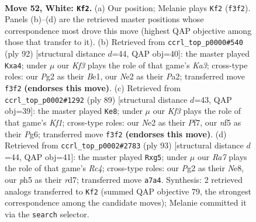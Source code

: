 \documentclass[11pt]{article}
\begin{document}
\clearpage

\begin{figure}[p]\centering
\begin{subfigure}{0.46\textwidth}\centering
\resizebox{\linewidth}{!}{%
\newchessgame
\chessboard[
  setfen={6r1/R7/3pk3/5npp/8/1p3K2/1R2N1Pr/8 w - - 2 52},
  showmover=false,
  pgfstyle=straightmove, color=movearrow, markmove={f3-f2}
]}
\caption{}
\end{subfigure}\hfill
\begin{subfigure}{0.46\textwidth}\centering
\resizebox{\linewidth}{!}{%
\newchessgame
\chessboard[
  setfen={8/5k2/4pp1p/1P1n4/p7/K4P2/P7/2R1B2r w - - 1 47},
  showmover=false,
  pgfstyle=straightmove, color=movearrow, markmove={a3-a4}
]}
\caption{}
\end{subfigure}
\\[4pt]
\begin{subfigure}{0.46\textwidth}\centering
\resizebox{\linewidth}{!}{%
\newchessgame
\chessboard[
  setfen={3r1k2/5p2/3P2p1/2r5/2PR4/6P1/P4PB1/6K1 b - - 2 45},
  showmover=false,
  pgfstyle=straightmove, color=movearrow, markmove={f8-e8}
]}
\caption{}
\end{subfigure}\hfill
\begin{subfigure}{0.46\textwidth}\centering
\resizebox{\linewidth}{!}{%
\newchessgame
\chessboard[
  setfen={R3nk2/3R4/p5p1/2r3P1/P2N4/1P2r3/1K6/8 b - - 20 47},
  showmover=false,
  pgfstyle=straightmove, color=movearrow, markmove={c5-g5}
]}
\caption{}
\end{subfigure}
\caption{\textbf{Move 52, White: \texttt{Kf2}.} (a) Our position; Melanie plays \texttt{Kf2} (\texttt{f3f2}). Panels (b)--(d) are the retrieved master positions whose correspondence most drove this move (highest QAP objective among those that transfer to it). (b) Retrieved from \texttt{ccrl\_top\_p0000\#540} (ply 92) [structural distance $d$=44, QAP obj=40]: the master played \texttt{Kxa4}; under $\mu$ our \emph{Kf3} plays the role of that game's \emph{Ka3}; cross-type roles: our \emph{P}g2 as their \emph{B}e1, our \emph{N}e2 as their \emph{P}a2; transferred move \texttt{f3f2} \textbf{(endorses this move)}. (c) Retrieved from \texttt{ccrl\_top\_p0002\#1292} (ply 89) [structural distance $d$=43, QAP obj=39]: the master played \texttt{Ke8}; under $\mu$ our \emph{Kf3} plays the role of that game's \emph{Kf1}; cross-type roles: our \emph{N}e2 as their \emph{P}f7, our \emph{n}f5 as their \emph{P}g6; transferred move \texttt{f3f2} \textbf{(endorses this move)}. (d) Retrieved from \texttt{ccrl\_top\_p0002\#2783} (ply 93) [structural distance $d$=44, QAP obj=41]: the master played \texttt{Rxg5}; under $\mu$ our \emph{Ra7} plays the role of that game's \emph{Rc4}; cross-type roles: our \emph{P}g2 as their \emph{N}e8, our \emph{p}h5 as their \emph{r}d7; transferred move \texttt{a7a4}. Synthesis: 2 retrieved analogs transferred to \texttt{Kf2} (summed QAP objective 79, the strongest correspondence among the candidate moves); Melanie committed it via the \texttt{search} selector.}
\label{fig:thought-m102}
\end{figure}
\end{document}
